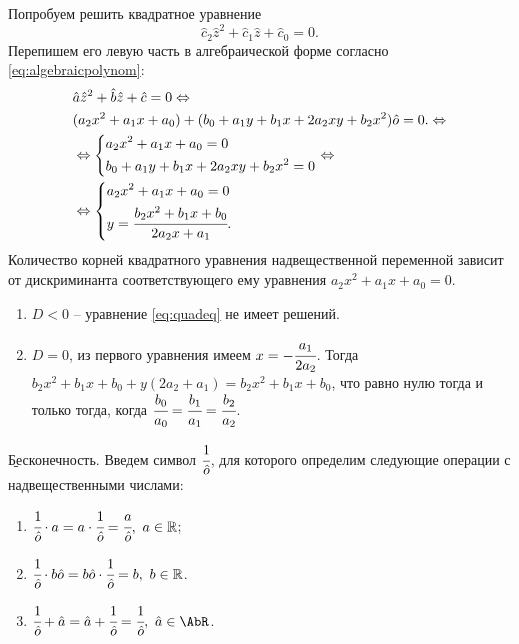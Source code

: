 \begin{example}
Попробуем решить квадратное уравнение 
	\begin{equation}\label{eq:quadeq}
		\hat{c}_2\hat{z}^2+\hat{c}_1\hat{z}+\hat{c}_0=0.
	\end{equation}
Перепишем его левую часть в алгебраической форме согласно \eqref{eq:algebraicpolynom}:
	\begin{eqnarray*}
		& \hat{a}\hat{z}^2+\hat{b}\hat{z}+\hat{c}=0\Leftrightarrow\\
		& (a_2x^2+a_1x+a_0)+(b_0+a_1y+b_1x+2a_2xy+b_2x^2)\hat{o}=0.\Leftrightarrow\\
		& \Leftrightarrow\left\{
			\begin{aligned}
				& a_2x^2+a_1x+a_0=0 \\
				& b_0+a_1y+b_1x+2a_2xy+b_2x^2=0
			\end{aligned}
		\right.\Leftrightarrow\\
		& \Leftrightarrow\left\{
			\begin{aligned}
				& a_2x^2+a_1x+a_0=0 \\
				& y=\cfrac{b_2x^2+b_1x+b_0}{2a_2x+a_1}.
			\end{aligned}
		\right.
	\end{eqnarray*}
Количество корней квадратного уравнения надвещественной переменной зависит от дискриминанта соответствующего ему уравнения $a_2x^2+a_1x+a_0=0$.
	\begin{enumerate}
		\item $D<0$ -- уравнение \eqref{eq:quadeq} не имеет решений.
		\item $D=0$, из первого уравнения имеем $x=-\cfrac{a_1}{2a_2}$. Тогда $b_2x^2+b_1x+b_0+y(2a_2+a_1)=b_2x^2+b_1x+b_0$, что равно нулю тогда и только тогда, когда $\cfrac{b_0}{a_0}=\cfrac{b_1}{a_1}=\cfrac{b_2}{a_2}$.
	\end{enumerate}
\end{example}

\b{Бесконечность.} Введем символ $\cfrac{1}{\hat{o}}$, для которого определим следующие операции с надвещественными числами:
\begin{enumerate}
	\item $\cfrac{1}{\hat{o}}\cdot a=a\cdot\cfrac{1}{\hat{o}}=\cfrac{a}{\hat{o}},\,\,a\in\mathbb{R}$;
	\item $\cfrac{1}{\hat{o}}\cdot b\hat{o}=b\hat{o}\cdot\cfrac{1}{\hat{o}}=b,\,\,b\in\mathbb{R}$.
	\item $\cfrac{1}{\hat{o}}+\hat{a}=\hat{a}+\cfrac{1}{\hat{o}}=\cfrac{1}{\hat{o}},\,\,\hat{a}\in\AbR$.
\end{enumerate}